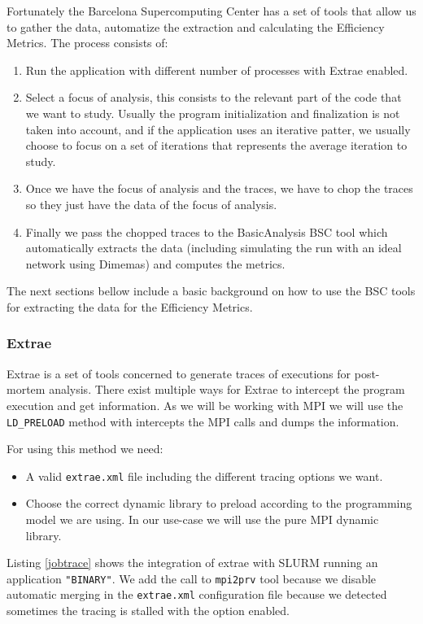 \noindent
Fortunately the Barcelona Supercomputing Center has a set of tools that allow us to gather the data, automatize the extraction and calculating the Efficiency Metrics. The process consists of:
\begin{enumerate}
  \item Run the application with different number of processes with Extrae enabled.
  \item Select a focus of analysis, this consists to the relevant part of the code that we want to study. Usually the program initialization and finalization is not taken into account, and if the application uses an iterative patter, we usually choose to focus on a set of iterations that represents the average iteration to study.
  \item Once we have the focus of analysis and the traces, we have to chop the traces so they just have the data of the focus of analysis.
  \item Finally we pass the chopped traces to the BasicAnalysis BSC tool which automatically extracts the data (including simulating the run with an ideal network using Dimemas) and computes the metrics. 
\end{enumerate}

The next sections bellow include a basic background on how to use the BSC tools for extracting the data for the Efficiency Metrics.

\subsubsection{Extrae}\label{extrae}

Extrae\cite{extrae} is a set of tools concerned to generate traces of executions for post-mortem analysis. There exist multiple ways for Extrae to intercept the program execution and get information. As we will be working with MPI we will use the \texttt{LD\_PRELOAD} method with intercepts the MPI calls and dumps the information.

For using this method we need:
\begin{itemize}
  \item A valid \texttt{extrae.xml} file including the different tracing options we want. 
  \item Choose the correct dynamic library to preload according to the programming model we are using. In our use-case we will use the pure MPI dynamic library. 
\end{itemize}

\noindent
Listing \ref{jobtrace} shows the integration of extrae with SLURM running an application \texttt{"BINARY"}. We add the call to \texttt{mpi2prv} tool because we disable automatic merging in the \texttt{extrae.xml} configuration file because we detected sometimes the tracing is stalled with the option enabled.


